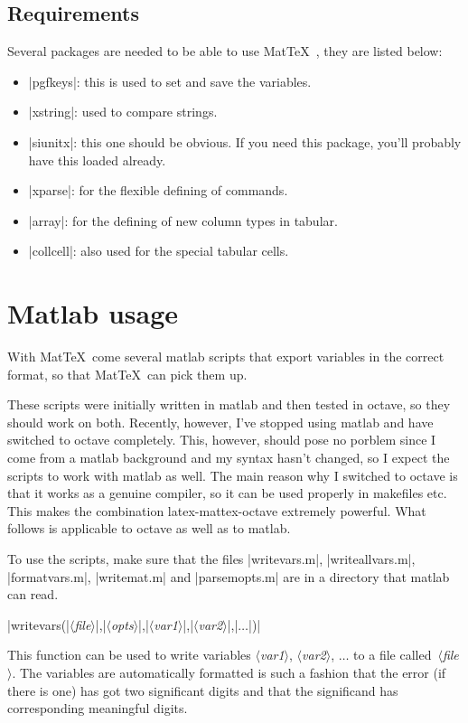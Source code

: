 \documentclass[a4paper,10pt]{article}
\makeatletter
\newcommand{\mt}{Mat\TeX\ }
\newcommand\argu[1]{{\color{black}$\langle$\textit{#1}$\rangle$}}
\newcommand\co[0]{\color{violet}}
\newcommand\mtmrg[1]{\marginpar{\texttt{#1}}}
\newcommand\mmrg[1]{\index{#1@\texttt{#1}}\mtmrg{#1}}
\makeatother
\begin{document}
\subsection{Requirements}
Several packages are needed to be able to use \mt, they are listed below:
\begin{itemize}
	\item |pgfkeys|: this is used to set and save the variables.
	\item |xstring|: used to compare strings.
	\item |siunitx|: this one should be obvious. If you need this package, you'll probably have this loaded already.
	\item |xparse|: for the flexible defining of commands.
	\item |array|: for the defining of new column types in tabular.
	\item |collcell|: also used for the special tabular cells.
\end{itemize}



\section{Matlab usage}
With \mt come several matlab scripts that export variables in the correct format, so that \mt can pick them up.

These scripts were initially written in matlab and then tested in octave, so they should work on both. Recently, however, I've stopped using matlab and have switched to octave completely. This, however, should pose no porblem since I come from a matlab background and my syntax hasn't changed, so I expect the scripts to work with matlab as well. The main reason why I switched to octave is that it works as a genuine compiler, so it can be used properly in makefiles etc. This makes the combination latex-mattex-octave extremely powerful. What follows is applicable to octave as well as to matlab.

To use the scripts, make sure that the files |writevars.m|, |writeallvars.m|,\\ |formatvars.m|, |writemat.m| and |parsemopts.m| are in a directory that matlab can read.

\bigskip
{\co |writevars(|\argu{file}|,|\argu{opts}|,|\argu{var1}|,|\argu{var2}|,|$\ldots$|)|}

\mmrg{writevars}
This function can be used to write variables \argu{var1}, \argu{var2}, $\ldots$ to a file called~\argu{file}. The variables are automatically formatted is such a fashion that the error (if there is one) has got two significant digits and that the significand has corresponding meaningful digits.
\end{document}
